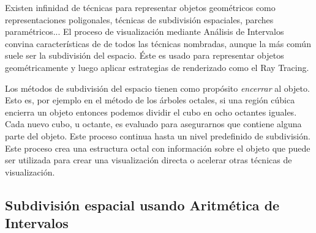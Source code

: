 Existen infinidad de técnicas para representar objetos geométricos como representaciones poligonales, técnicas de subdivisión espaciales, parches paramétricos... El proceso de visualización mediante Análisis de Intervalos convina características de de todos las técnicas nombradas, aunque la más común suele ser la subdivisión del espacio. Éste es usado para representar objetos geométricamente  y luego aplicar estrategias de renderizado como el Ray Tracing.
\par Los métodos de subdivisión del espacio tienen como propósito{ \em encerrar} al objeto.  Esto es, por ejemplo en el método de los árboles octales, si una región cúbica encierra un objeto entonces podemos dividir el cubo en ocho octantes iguales. Cada nuevo cubo, u octante, es evaluado para asegurarnos que contiene alguna parte del objeto. Este proceso continua hasta un nivel predefinido de subdivisión.
\\ Este proceso crea una estructura octal con información sobre el objeto que puede ser utilizada para crear una visualización directa o acelerar otras técnicas de visualización.

\subsection{Subdivisión espacial usando Aritmética de Intervalos}

